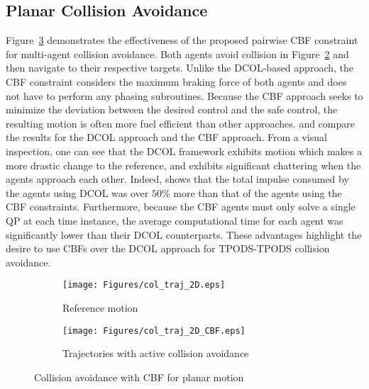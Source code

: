 
\subsection{Planar Collision Avoidance}

Figure~\ref{fig: CBF_2d_traj} demonstrates the effectiveness of the proposed pairwise CBF constraint for multi-agent collision avoidance. Both agents avoid collision in Figure~\ref{fig:col_traj_2D_b_CBF} and then navigate to their respective targets. Unlike the DCOL-based approach, the CBF constraint considers the maximum braking force of both agents and does not have to perform any phasing subroutines. Because the CBF approach seeks to minimize the deviation between the desired control and the safe control, the resulting motion is often more fuel efficient than other approaches.  and  compare the results for the DCOL approach and the CBF approach. From a visual inspection, one can see that the DCOL framework exhibits motion which makes a more drastic change to the reference, and exhibits significant chattering when the agents approach each other. Indeed,  shows that the total impulse consumed by the agents using DCOL was over $50$\% more than that of the agents using the CBF constraints. Furthermore, because the CBF agents must only solve a single QP at each time instance, the average computational time for each agent was significantly lower than their DCOL counterparts. These advantages highlight the desire to use CBFs over the DCOL approach for TPODS-TPODS collision avoidance.

\begin{figure}[t!]
     \begin{subfigure}[b]{0.49\textwidth}
        \centering
         \texttt{[image: Figures/col\_traj\_2D.eps]}
         \caption{Reference motion}\label{fig:col_traj_2D_a_CBF}
     \end{subfigure}   
     \begin{subfigure}[b]{0.49\textwidth}
        \centering
         \texttt{[image: Figures/col\_traj\_2D\_CBF.eps]}
         \caption{Trajectories with active collision avoidance}\label{fig:col_traj_2D_b_CBF}
     \end{subfigure}
     \centering
    \caption{Collision avoidance with CBF for planar motion}
     \label{fig: CBF_2d_traj}
\end{figure}


